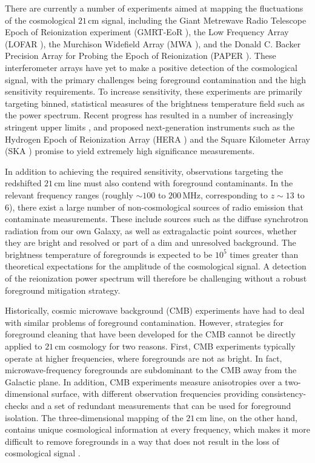 \documentclass[twocolumn,aps,prd,nofootinbib,showpacs]{revtex4-1}
\begin{document}
There are currently a number of experiments aimed at mapping the fluctuations of the cosmological $21\,\textrm{cm}$ signal, including the Giant Metrewave Radio Telescope Epoch of Reionization experiment (GMRT-EoR \cite{Paciga2013}), the Low Frequency Array (LOFAR \cite{Yatawatta2013}), the Murchison Widefield Array (MWA \cite{Tingay2013}), and the Donald C. Backer Precision Array for Probing the Epoch of Reionization (PAPER \cite{Parsons2010}).  These interferometer arrays have yet to make a positive detection of the cosmological signal, with the primary challenges being foreground contamination and the high sensitivity requirements.  To increase sensitivity, these experiments are primarily targeting binned, statistical measures of the brightness temperature field such as the power spectrum.  Recent progress has resulted in a number of increasingly stringent upper limits \cite{Paciga2013,Dillon2014,Parsons2013}, and proposed next-generation instruments such as the Hydrogen Epoch of Reionization Array (HERA \cite{Pober2014}) and the Square Kilometer Array (SKA \cite{Mellema2013}) promise to yield extremely high significance measurements.

In addition to achieving the required sensitivity, observations targeting the redshifted $21\,\textrm{cm}$ line must also contend with foreground contaminants. In the relevant frequency ranges (roughly $\sim 100$ to $200\,\textrm{MHz}$, corresponding to $z\sim13$ to $6$), there exist a large number of non-cosmological sources of radio emission that contaminate measurements.  These include sources such as the diffuse synchrotron radiation from our own Galaxy, as well as extragalactic point sources, whether they are bright and resolved or part of a dim and unresolved background.  The brightness temperature of foregrounds is expected to be $10^5$ times greater than theoretical expectations for the amplitude of the cosmological signal.  A detection of the reionization power spectrum will therefore be challenging without a robust foreground mitigation strategy.

Historically, cosmic microwave background (CMB) experiments have had to deal with similar problems of foreground contamination.  However, strategies for foreground cleaning that have been developed for the CMB cannot be directly applied to $21\,\textrm{cm}$ cosmology for two reasons.  First, CMB experiments typically operate at higher frequencies, where foregrounds are not as bright.  In fact, microwave-frequency foregrounds are subdominant to the CMB away from the Galactic plane.  In addition, CMB experiments measure anisotropies over a two-dimensional surface, with different observation frequencies providing consistency-checks and a set of redundant measurements that can be used for foreground isolation.  The three-dimensional mapping of the $21\,\textrm{cm}$ line, on the other hand, contains unique cosmological information at every frequency, which makes it more difficult to remove foregrounds in a way that does not result in the loss of cosmological signal \cite{Liu2013}.
\end{document}
